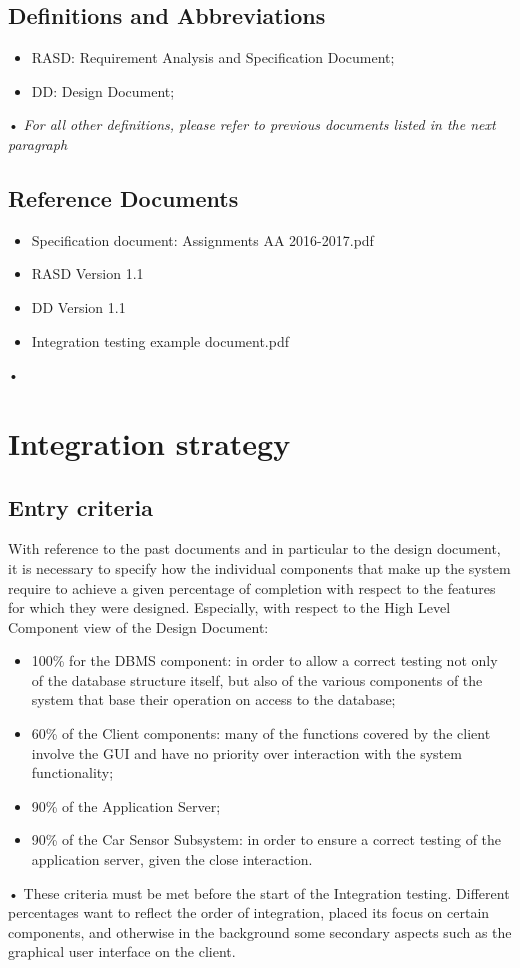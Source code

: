 \documentclass[10pt, a4paper,titlepage]{article}
\begin{document}
\subsection{Definitions and Abbreviations}
\begin{itemize}
\item RASD: Requirement Analysis and Specification Document;
\item DD: Design Document;
\end{itemize}•
\emph{For all other definitions, please refer to previous documents listed in the next paragraph}
\subsection{Reference Documents}
\begin{itemize}
\item Specification document: Assignments AA 2016-2017.pdf
\item RASD Version 1.1
\item DD Version 1.1
\item Integration testing example document.pdf
\end{itemize}•
\section{Integration strategy}
\subsection{Entry criteria}
With reference to the past documents and in particular to the design document, it is necessary to specify how the individual components that make up the system require to achieve a given percentage of completion with respect to the features for which they were designed.
Especially, with respect to the High Level Component view of the Design Document:
\begin{itemize}
\item 100\% for the DBMS component: in order to allow a correct testing not only of the database structure itself, but also of the various components of the system that base their operation on access to the database;
\item 60\% of the Client components: many of the functions covered by the client involve the GUI and have no priority over interaction with the system functionality;
\item 90\% of the Application Server;
\item 90\% of the Car Sensor Subsystem: in order to ensure a correct testing of the application server, given the close interaction.
\end{itemize}•
These criteria must be met before the start of the Integration testing. Different percentages want to reflect the order of integration, placed its focus on certain components, and otherwise in the background some secondary aspects such as the graphical user interface on the client.
\end{document}
